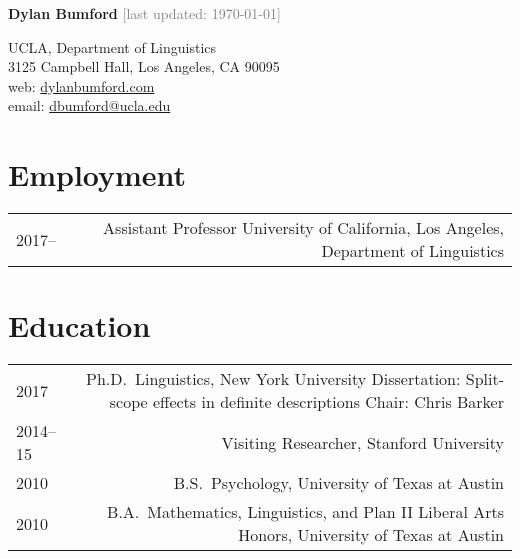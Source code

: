 \documentclass[12pt]{article}
\begin{document}
\textbf{Dylan Bumford}\hfill
\textcolor{gray}{[last updated: \today]}

\bigskip

\begin{minipage}[t]{0.55\textwidth}
UCLA, Department of Linguistics\\
3125 Campbell Hall, Los Angeles, CA 90095
\\
web: \href{https://dylanbumford.com}{dylanbumford.com}\\
email: \href{mailto:dbumford@ucla.edu}{dbumford@ucla.edu}
\end{minipage}
\begin{minipage}[t]{\linegoal}
\raggedleft%
\end{minipage}

\bigskip
\bigskip

\section*{Employment}

\begin{longtable}{LR}
  2017--    & Assistant Professor\newline
              University of California, Los Angeles, Department of Linguistics
\end{longtable}

\medskip

\section*{Education}

\begin{longtable}{LR}
  2017        & Ph.D.~Linguistics, New York University\newline
                Dissertation: Split-scope effects in definite descriptions\newline
                Chair: Chris Barker
                \\
  2014--15    & Visiting Researcher, Stanford University\\
  2010        & B.S.~Psychology, University of Texas at Austin\\
  2010        & B.A.~Mathematics, Linguistics, and Plan II Liberal Arts Honors, University of
                Texas at Austin
\end{longtable}
\end{document}
